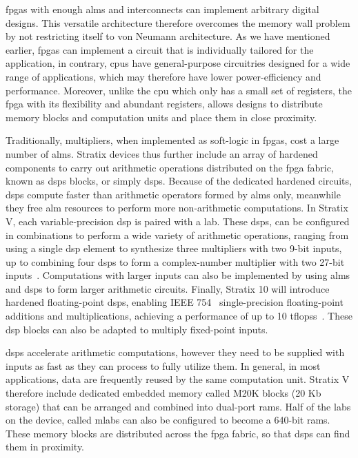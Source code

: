 \Glspl{fpga} with enough \glspl{alm} and interconnects can implement arbitrary
digital designs.  This versatile architecture therefore overcomes the memory
wall problem by not restricting itself to von Neumann architecture.  As we have
mentioned earlier, \glspl{fpga} can implement a circuit that is individually
tailored for the application, in contrary, \glspl{cpu} have general-purpose
circuitries designed for a wide range of applications, which may therefore have
lower power-efficiency and performance.  Moreover, unlike the \gls{cpu} which
only has a small set of registers, the \gls{fpga} with its flexibility and
abundant registers, allows designs to distribute memory blocks and computation
units and place them in close proximity.

Traditionally, multipliers, when implemented as soft-logic in \glspl{fpga},
cost a large number of \glspl{alm}.  Stratix devices thus further include an
array of hardened components to carry out arithmetic operations distributed
on the \gls{fpga} fabric, known as \glspl{dsp} blocks, or simply \glspl{dsp}.
Because of the dedicated hardened circuits, \glspl{dsp} compute faster than
arithmetic operators formed by \glspl{alm} only, meanwhile they free \gls{alm}
resources to perform more non-arithmetic computations.  In Stratix V, each
variable-precision \gls{dsp} is paired with a \gls{lab}\@.  These \glspl{dsp},
can be configured in combinations to perform a wide variety of arithmetic
operations, ranging from using a single \gls{dsp} element to synthesize
three multipliers with two 9-bit inputs, up to combining four \glspl{dsp}
to form a complex-number multiplier with two 27-bit inputs~\cite{stratix5}.
Computations with larger inputs can also be implemented by using \glspl{alm}
and \glspl{dsp} to form larger arithmetic circuits.  Finally, Stratix 10 will
introduce hardened floating-point \glspl{dsp}, enabling IEEE 754~\cite{ieee754}
single-precision floating-point additions and multiplications, achieving a
performance of up to 10 \glspl{tflops}~\cite{stratix10fp}.  These \gls{dsp}
blocks can also be adapted to multiply fixed-point inputs.

\Glspl{dsp} accelerate arithmetic computations, however they need to be
supplied with inputs as fast as they can process to fully utilize them.
In general, in most applications, data are frequently reused by the same
computation unit.  Stratix V therefore include dedicated embedded memory called
M20K blocks (20 Kb storage) that can be arranged and combined into dual-port
\glspl{ram}.  Half of the \glspl{lab} on the device, called \glspl{mlab} can
also be configured to become a 640-bit \glspl{ram}.  These memory blocks are
distributed across the \gls{fpga} fabric, so that \glspl{dsp} can find them in
proximity.


